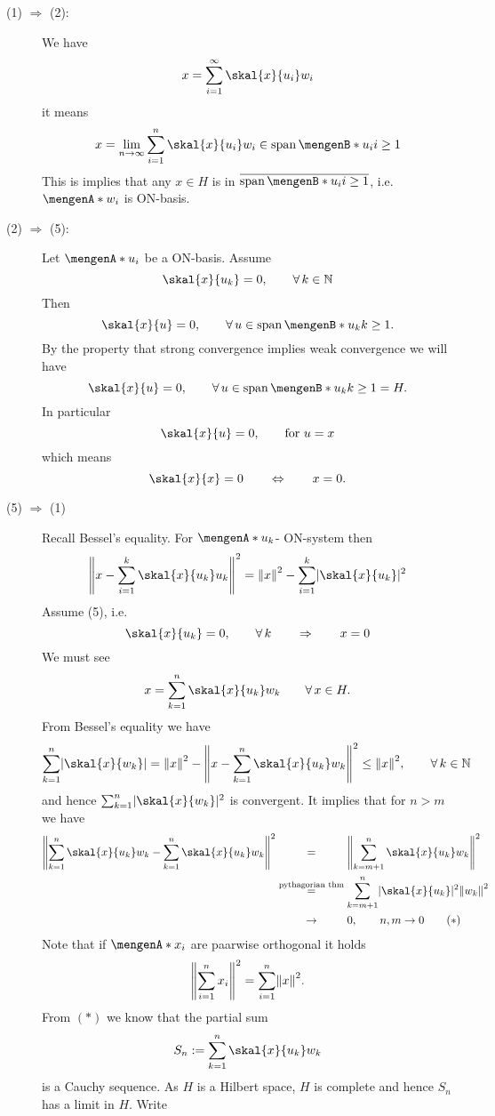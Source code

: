 \begin{beweis}
 	\begin{description}
 		\item[(1) $\Rightarrow $ (2):] We have 
		\[
			x = \sum^{\infty}_{i=1} \skal{x}{u_i}w_i
		\] 
		it means
		\[
			x = \lim_{n \to \infty} \sum^{n}_{i=1} \skal{x}{u_i}w_i \in \spn\set[u_i]{i \geq 1}
		\]
		This is implies that any $x \in H$ is in $\overline{\spn \set[u_i]{i \geq 1}}$, i.e. $\set{w_i}$ is ON-basis.
		\item[(2) $\Rightarrow$ (5):] Let $\set{u_i}$ be a ON-basis. Assume 
		\[
			\skal{x}{u_k} = 0, \qquad \forall\,  k \in \mathbb{N}
		\]
		Then
		\[
			\skal{x}{u} = 0, \qquad \forall\, u \in \spn\set[u_k]{k \geq 1}.
		\]
		By the property that strong convergence implies weak convergence we will have 
		\[
			\skal{x}{u}= 0, \qquad \forall\, u \in \spn\set[u_k]{k \geq 1} = H.
		\]
		In particular
		\[
			\skal{x}{u} = 0, \qquad \text{for }u =x
		\]
		which means
		\[
			\skal{x}{x} = 0 \qquad \Leftrightarrow \qquad  x=0.
		\]
		\item[(5) $\Rightarrow$ (1)] Recall Bessel's equality. For $\set{u_k}$- ON-system then 
		\[
			\norm{x- \sum^{k}_{i=1} \skal{x}{u_k}u_k}^2 = \norm{x}^2 - \sum^{k}_{i=1} \abs{\skal{x}{u_k}}^2
		\]
		Assume (5), i.e.
		\[
			\skal{x}{u_k} = 0, \qquad \forall\, k \qquad \Rightarrow \qquad x = 0
		\]
		We must see
		\[
			x = \sum_{k=1}^{n} \skal{x}{u_k}w_k \qquad \forall\, x \in H.
		\]
		From Bessel's equality we have
		\[
			\sum_{k=1}^{n} \abs{\skal{x}{w_k}} = \norm{x}^2 - \norm{x- \sum_{k=1}^{n} \skal{x}{u_k}w_k}^2 \leq \norm{x}^2, \qquad \forall\, k \in \mathbb{N}
		\]
		and hence $\sum_{k=1}^{n}\abs{\skal{x}{w_k}}^2$ is convergent. It implies that for $n>m$ we have
		\begin{align*}
			\norm{\sum_{k=1}^{n}\skal{x}{u_k}w_k - \sum_{k=1}^{n} \skal{x}{u_k}w_k}^2 
			&\stackrel{\hphantom{\text{pythagorian thm}}}{=} \norm{\sum_{k=m+1}^{n} \skal{x}{u_k}w_k}^2 \\
			&\stackrel{\text{pythagorian thm}}{=} \sum_{k=m+1}^{n} \abs{\skal{x}{u_k}}^2 \norm{w_k}^2 \\
			&\stackrel{\hphantom{\text{pythagorian thm}}}{\to } 0, \qquad n,m \to 0 \qquad (*)
		\end{align*}
		Note that if $\set{x_i}$ are paarwise orthogonal it holds
		\[
			\norm{\sum^{n}_{i=1}x_i}^2 = \sum^{n}_{i=1} \norm{x}^2.
		\]
		From $(*)$ we know that the partial sum
		\[
			S_n := \sum_{k=1}^{n}\skal{x}{u_k}w_k
		\]
		is a Cauchy sequence. As $H$ is a Hilbert space, $H$ is complete and hence $S_n$ has a limit in $H$. Write

\end{description}
\end{beweis}
